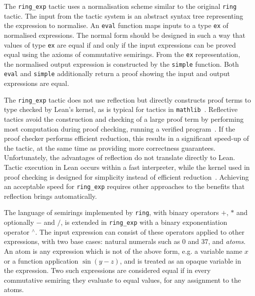 \documentclass{llncs}
\newcommand{\lean}[1]{\texttt{#1}\xspace} %
\newcommand{\mathlib}{\texttt{mathlib}\xspace}
\newcommand{\pow}{{${}^\wedge$}\xspace}
\newcommand{\ring}{\lean{ring}}
\newcommand{\ringexp}{\lean{ring\_exp}}
\begin{document}
The \ringexp tactic uses a normalisation scheme similar to the original \ring tactic.
The input from the tactic system is an abstract syntax tree representing the expression to normalise.
An \lean{eval} function maps inputs to a type \lean{ex} of normalised expressions.
The normal form should be designed in such a way that values of type \lean{ex} are equal
if and only if the input expressions can be proved equal using the axioms of commutative semirings.
From the \lean{ex} representation, the normalised output expression is constructed by the \lean{simple} function.
Both \lean{eval} and \lean{simple} additionally return a proof showing the input and output expressions are equal.

The \ringexp tactic does not use reflection but directly constructs proof terms to type checked by Lean's kernel,
as is typical for tactics in \mathlib~\cite{mathlib}.
Reflective tactics avoid the construction and checking of a large proof term
by performing most computation during proof checking, running a verified program~\cite{reflection-tactics}.
If the proof checker performs efficient reduction, this results in a significant speed-up of the tactic,
at the same time as providing more correctness guarantees.
Unfortunately, the advantages of reflection do not translate directly to Lean.
Tactic execution in Lean occurs within a fast interpreter,
while the kernel used in proof checking is designed for simplicity instead of efficient reduction~\cite{lean-tactics}.
Achieving an acceptable speed for \ringexp requires other approaches to the benefits that reflection brings automatically.

The language of semirings implemented by \ring, with binary operators $+$, $*$ and optionally $-$ and $/$,
is extended in \ringexp with a binary exponentiation operator \pow.
The input expression can consist of these operators applied to other expressions,
with two base cases: natural numerals such as $0$ and $37$, and \emph{atoms}.
An atom is any expression which is not of the above form, e.g. a variable name $x$ or a function application $\sin (y - z)$,
and is treated as an opaque variable in the expression.
Two such expressions are considered equal if in every commutative semiring they evaluate to equal values, for any assignment to the atoms.
\end{document}
